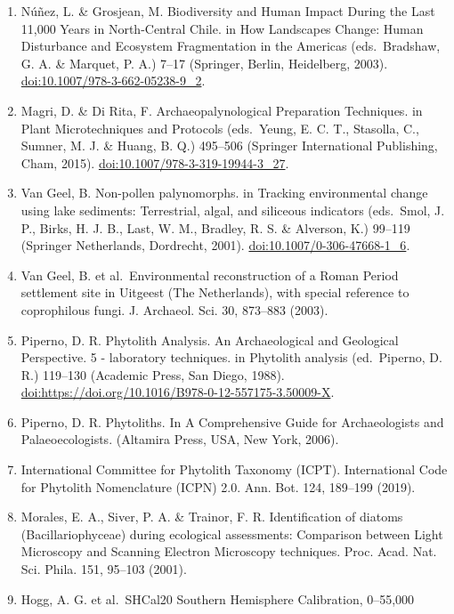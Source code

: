 \documentclass[
]{article}
\begin{document}
\begin{enumerate}
  Barberena, R., Méndez, C. \& de Porras, M. E. Zooming out from
  archaeological discontinuities: The meaning of mid-Holocene temporal
  troughs in South American deserts. J. Anthropol. Archaeol. 46, 68--81
  (2017).
\item
  Núñez, L. \& Grosjean, M. Biodiversity and Human Impact During the
  Last 11,000 Years in North-Central Chile. in How Landscapes Change:
  Human Disturbance and Ecosystem Fragmentation in the Americas
  (eds.~Bradshaw, G. A. \& Marquet, P. A.) 7--17 (Springer, Berlin,
  Heidelberg, 2003). \url{doi:10.1007/978-3-662-05238-9_2}.
\item
  Magri, D. \& Di Rita, F. Archaeopalynological Preparation Techniques.
  in Plant Microtechniques and Protocols (eds.~Yeung, E. C. T.,
  Stasolla, C., Sumner, M. J. \& Huang, B. Q.) 495--506 (Springer
  International Publishing, Cham, 2015).
  \url{doi:10.1007/978-3-319-19944-3_27}.
\item
  Van Geel, B. Non-pollen palynomorphs. in Tracking environmental change
  using lake sediments: Terrestrial, algal, and siliceous indicators
  (eds.~Smol, J. P., Birks, H. J. B., Last, W. M., Bradley, R. S. \&
  Alverson, K.) 99--119 (Springer Netherlands, Dordrecht, 2001).
  \url{doi:10.1007/0-306-47668-1_6}.
\item
  Van Geel, B. et al.~Environmental reconstruction of a Roman Period
  settlement site in Uitgeest (The Netherlands), with special reference
  to coprophilous fungi. J. Archaeol. Sci. 30, 873--883 (2003).
\item
  Piperno, D. R. Phytolith Analysis. An Archaeological and Geological
  Perspective. 5 - laboratory techniques. in Phytolith analysis
  (ed.~Piperno, D. R.) 119--130 (Academic Press, San Diego, 1988).
  \url{doi:https://doi.org/10.1016/B978-0-12-557175-3.50009-X}.
\item
  Piperno, D. R. Phytoliths. In A Comprehensive Guide for Archaeologists
  and Palaeoecologists. (Altamira Press, USA, New York, 2006).
\item
  International Committee for Phytolith Taxonomy (ICPT). International
  Code for Phytolith Nomenclature (ICPN) 2.0. Ann. Bot. 124, 189--199
  (2019).
\item
  Morales, E. A., Siver, P. A. \& Trainor, F. R. Identification of
  diatoms (Bacillariophyceae) during ecological assessments: Comparison
  between Light Microscopy and Scanning Electron Microscopy techniques.
  Proc. Acad. Nat. Sci. Phila. 151, 95--103 (2001).
\item
  Hogg, A. G. et al.~SHCal20 Southern Hemisphere Calibration, 0--55,000

\end{enumerate}
\end{document}
